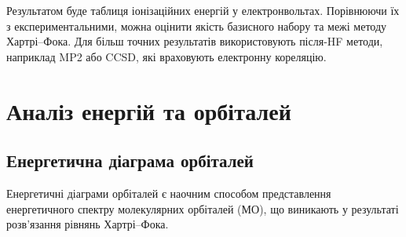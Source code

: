 Результатом буде таблиця іонізаційних енергій у електронвольтах.
Порівнюючи їх з експериментальними, можна оцінити якість базисного набору та межі методу Хартрі–Фока.
Для більш точних результатів використовують після-HF методи, наприклад MP2 або CCSD, які враховують електронну кореляцію.

\section{Аналіз енергій та орбіталей}


\subsection{Енергетична діаграма орбіталей}


Енергетичні діаграми орбіталей є наочним способом представлення енергетичного спектру молекулярних орбіталей (МО), що виникають у результаті розв’язання рівнянь Хартрі–Фока.


